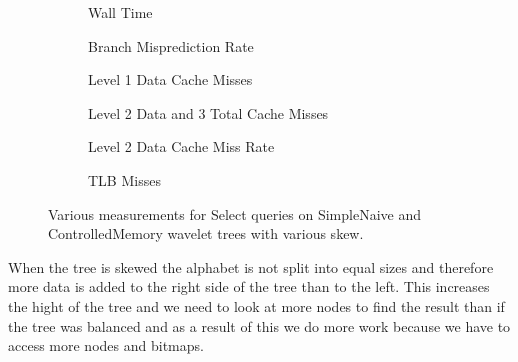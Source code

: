 \begin{figure}\tiny
\begin{subfigure}{0.48\textwidth}
	
	\caption{Wall Time}
	\label{fig:NaiveSelectSkewRunningTime}
\end{subfigure}
\hfill
\begin{subfigure}{0.48\textwidth}
	
	\caption{Branch Misprediction Rate}
	\label{fig:NaiveVsControlledNodeMemorySkewSelectQueryBMrate}
\end{subfigure}

\begin{subfigure}{0.48\textwidth}
	
	\caption{Level 1 Data Cache Misses}
	\label{fig:L1NaiveControlledNodeMemorySelectSkewCacheMisses}
\end{subfigure}
\hfill
\begin{subfigure}{0.48\textwidth}
 	
	\caption{Level 2 Data and 3 Total Cache Misses}
	\label{fig:L2L3NaiveControlledNodeMemorySelectSkewCacheMisses}
\end{subfigure}

\begin{subfigure}{0.48\textwidth}
	
	\caption{Level 2 Data Cache Miss Rate}
	\label{fig:NaiveVsControlledNodeMemorySkewSelectQuery_L2_DCMrate}
\end{subfigure}
\hfill
\begin{subfigure}{0.48\textwidth}
	
	\caption{TLB Misses}
	\label{fig:NaiveVsControlledNodeMemorySkewSelectQueryTLB}
\end{subfigure}

\caption{Various measurements for Select queries on SimpleNaive and ControlledMemory wavelet trees with various skew.}
\label{fig:NaiveVsControlledNodeMemorySkewSelectQuery}

\end{figure}


\restoregeometry



When the tree is skewed the alphabet is not split into equal sizes and therefore more data is added to the right side of the tree than to the left. 
This increases the hight of the tree and we need to look at more nodes to find the result than if the tree was balanced and as a result of this we do more work because we have to access more nodes and bitmaps.

